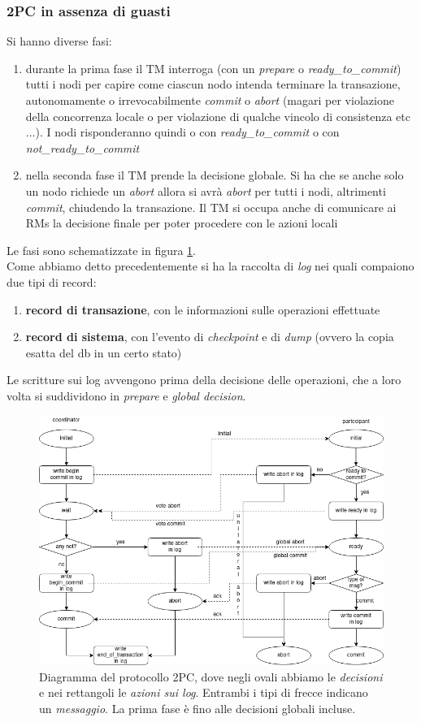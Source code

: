 \documentclass[a4paper,12pt, oneside]{book}
\begin{document}
\subsubsection{2PC in assenza di guasti}
Si hanno diverse fasi:
\begin{enumerate}
  \item durante la prima fase il TM interroga (con un \textit{prepare} o
  \textit{ready\_to\_commit}) tutti i nodi per capire come 
  ciascun nodo intenda terminare la transazione, autonomamente o
  irrevocabilmente \textit{commit} o \textit{abort} (magari per violazione della
  concorrenza locale o per violazione di qualche vincolo di consistenza
  etc$\ldots$). I nodi risponderanno quindi o con \textit{ready\_to\_commit} o
  con \\
  \textit{not\_ready\_to\_commit}
  \item nella seconda fase il TM prende la decisione globale. Si ha che se anche
  solo un nodo richiede un \textit{abort} allora si avrà \textit{abort} per
  tutti i nodi, altrimenti \textit{commit}, chiudendo la transazione. Il TM si
  occupa anche di comunicare ai RMs la decisione finale per poter procedere con
  le azioni locali 
\end{enumerate}
Le fasi sono schematizzate in figura \ref{fig:2pc}.\\
Come abbiamo detto precedentemente si ha la raccolta di \textit{log} nei quali
compaiono due tipi di record:
\begin{enumerate}
  \item \textbf{record di transazione}, con le informazioni sulle operazioni
  effettuate
  \item \textbf{record di sistema}, con l'evento di \textit{checkpoint} e di
  \textit{dump} (ovvero la copia esatta del db in un certo stato)
\end{enumerate}
Le scritture sui log avvengono prima della decisione delle operazioni, che a
loro volta si suddividono in \textit{prepare} e \textit{global decision}.
\begin{figure}[H]
  \centering
  \includegraphics[scale = 0.5]{img/2pc.png}
  \caption{Diagramma del protocollo 2PC, dove negli ovali abbiamo le\emph{
      decisioni} e nei rettangoli le \emph{azioni sui log}. Entrambi i tipi di
    frecce indicano un \emph{messaggio}. La prima fase è fino alle decisioni
    globali incluse.}
  \label{fig:2pc}
\end{figure}
\end{document}
